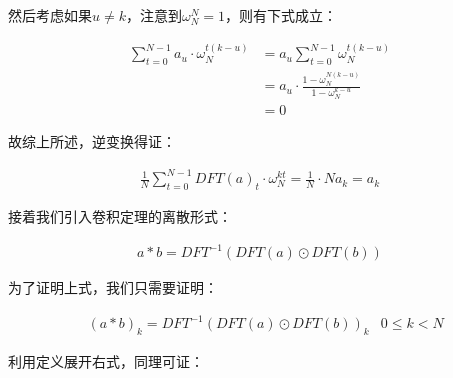 \documentclass[UTF8]{book}
\begin{document}
然后考虑如果$u \not = k$，注意到$\omega_N^N=1$，则有下式成立：
\begin{large}
    \begin{equation}
        \begin{aligned}
            \sum_{t=0}^{N-1}a_u \cdot \omega_N^{t(k-u)} &= a_u\sum_{t=0}^{N-1}\omega_N^{t(k-u)} \\
            &= a_u \cdot \frac{1-\omega_N^{N(k-u)}}{1-\omega_N^{k-u}} \\
            &= 0
            \nonumber
        \end{aligned}
    \end{equation}
\end{large}
故综上所述，逆变换得证：
\begin{large}
    \begin{equation}
        \begin{aligned}
            \frac{1}{N}\sum_{t=0}^{N-1}{DFT(a)_t \cdot \omega_{N}^{kt}}=\frac{1}{N} \cdot Na_k=a_k
            \nonumber
        \end{aligned}
    \end{equation}
\end{large}
接着我们引入卷积定理的离散形式：
\begin{large}
    \begin{equation}
        \begin{aligned}
            a*b=DFT^{-1}\left ( DFT(a) \odot DFT(b) \right )
            \nonumber
        \end{aligned}
    \end{equation}
\end{large}
为了证明上式，我们只需要证明：
\begin{large}
    \begin{equation}
        \begin{aligned}
            &(a*b)_k=DFT^{-1}\left ( DFT(a) \odot DFT(b) \right )_k & 0 \le k < N
            \nonumber
        \end{aligned}
    \end{equation}
\end{large}
利用定义展开右式，同理可证：
\end{document}
